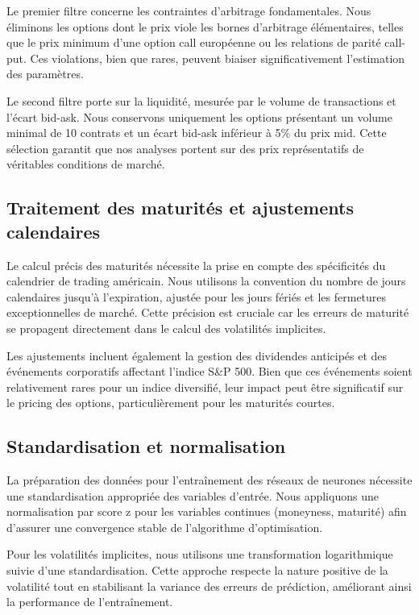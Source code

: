 Le premier filtre concerne les contraintes d'arbitrage fondamentales. Nous éliminons les options dont le prix viole les bornes d'arbitrage élémentaires, telles que le prix minimum d'une option call européenne ou les relations de parité call-put. Ces violations, bien que rares, peuvent biaiser significativement l'estimation des paramètres.

Le second filtre porte sur la liquidité, mesurée par le volume de transactions et l'écart bid-ask. Nous conservons uniquement les options présentant un volume minimal de 10 contrats et un écart bid-ask inférieur à 5\% du prix mid. Cette sélection garantit que nos analyses portent sur des prix représentatifs de véritables conditions de marché.

\subsection{Traitement des maturités et ajustements calendaires}

Le calcul précis des maturités nécessite la prise en compte des spécificités du calendrier de trading américain. Nous utilisons la convention du nombre de jours calendaires jusqu'à l'expiration, ajustée pour les jours fériés et les fermetures exceptionnelles de marché. Cette précision est cruciale car les erreurs de maturité se propagent directement dans le calcul des volatilités implicites.

Les ajustements incluent également la gestion des dividendes anticipés et des événements corporatifs affectant l'indice S\&P 500. Bien que ces événements soient relativement rares pour un indice diversifié, leur impact peut être significatif sur le pricing des options, particulièrement pour les maturités courtes.

\subsection{Standardisation et normalisation}

La préparation des données pour l'entraînement des réseaux de neurones nécessite une standardisation appropriée des variables d'entrée. Nous appliquons une normalisation par score z pour les variables continues (moneyness, maturité) afin d'assurer une convergence stable de l'algorithme d'optimisation.

Pour les volatilités implicites, nous utilisons une transformation logarithmique suivie d'une standardisation. Cette approche respecte la nature positive de la volatilité tout en stabilisant la variance des erreurs de prédiction, améliorant ainsi la performance de l'entraînement.

